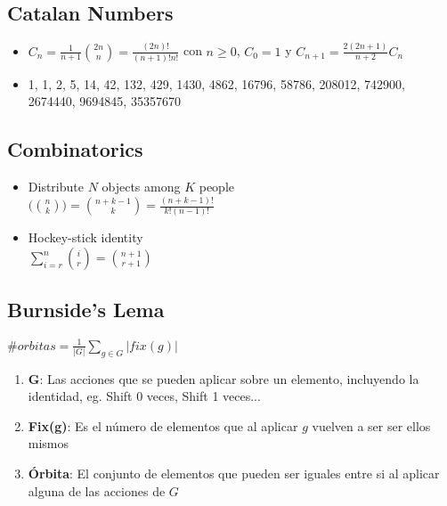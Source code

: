 \documentclass[10pt,letterpaper,twocolumn,twosided]{article}
\begin{document}
\subsection{Catalan Numbers}
\begin{itemize}
    \item $C_n = \frac{1}{n+1} \binom{2n}{n} = \frac{(2n)!}{(n+1)!n!}$ con $n \geq 0$, $C_0 = 1$ y $C_{n+1} = \frac{2(2n + 1)}{n + 2} C_{n}$
    \item 1, 1, 2, 5, 14, 42, 132, 429, 1430, 4862, 16796, 58786, 208012, 742900, 2674440, 9694845, 35357670
\end{itemize}


\subsection{Combinatorics}
\begin{itemize}
\item Distribute $N$ objects among $K$ people	\\
$\big(\binom{n}{k}\big) = \binom{n + k -1}{k} = \frac{(n + k - 1)!}{k!(n-1)!}$
\item Hockey-stick identity \\
$\sum_{i=r}^{n}\binom{i}{r} = \binom{n+1}{r+1}$
\end{itemize}


\subsection{Burnside's Lema}
$\#orbitas = \frac{1}{|G|}\sum_{g \in G}|fix(g)|$

\begin{enumerate}
    \item \textbf{G}: Las acciones que se pueden aplicar sobre un elemento, incluyendo la identidad, eg. Shift 0 veces, Shift 1 veces...
    \item \textbf{Fix(g)}: Es el número de elementos que al aplicar $g$ vuelven a ser ser ellos mismos
    \item \textbf{Órbita}: El conjunto de elementos que pueden ser iguales entre si al aplicar alguna de las acciones de $G$
\end{enumerate}
\end{document}
